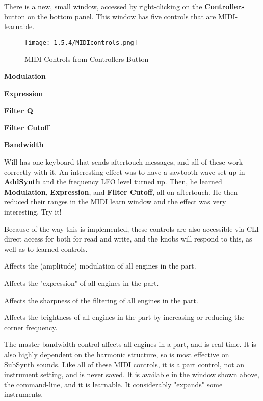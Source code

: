    There is a new, small window, accessed by right-clicking on
   the \textbf{Controllers} button on the bottom panel.
   This window has five controls that are MIDI-learnable.

\begin{figure}[H]
   \centering 
   \texttt{[image: 1.5.4/MIDIcontrols.png]}
   \caption{MIDI Controls from Controllers Button}
   \label{fig:instrument_midi_controllers}
\end{figure}

   \begin{enumber}
      \item \textbf{Modulation}
      \item \textbf{Expression}
      \item \textbf{Filter Q}
      \item \textbf{Filter Cutoff}
      \item \textbf{Bandwidth}
   \end{enumber}

   \setcounter{ItemCounter}{0}      %

   Will has one keyboard that sends aftertouch messages, and all of these work
   correctly with it. An interesting effect was to have a sawtooth wave set up
   in \textbf{AddSynth} and the frequency LFO level turned up.  Then, he
   learned \textbf{Modulation}, \textbf{Expression}, and \textbf{Filter
   Cutoff}, all on aftertouch. He then reduced their ranges in the MIDI learn
   window and the effect was very interesting.  Try it!

   Because of the way this is implemented, these controls are also accessible
   via CLI direct access for both for read and write, and the knobs will
   respond to this, as well as to learned controls.

   Affects the (amplitude) modulation of all engines in the part.

   Affects the "expression" of all engines in the part.

   Affects the sharpness of the filtering of all engines in the part.

   Affects the brightness of all engines in the part by increasing or reducing
   the corner frequency.

   The master bandwidth control affects all engines in a part, and is
   real-time. It is also highly dependent on the harmonic structure, so is most
   effective on SubSynth sounds.  Like all of these MIDI controls, it is a part
   control, not an instrument setting, and is never saved.
   It is available in the window shown above, the command-line, 
   and it is learnable.
   It considerably "expands" some instruments.

